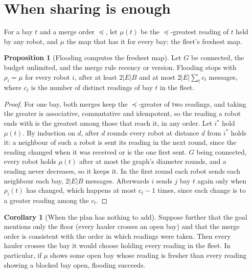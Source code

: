 \documentclass[11pt,a4paper]{article}
\theoremstyle{definition}
\newtheorem{proposition}{Proposition}
\newtheorem{corollary}{Corollary}
\newcommand{\merged}{\mu}
\begin{document}
\section{When sharing is enough}
\label{sec:enough}

For a bay $t$ and a merge order $\preceq$, let $\merged(t)$ be the
$\preceq$-greatest reading of $t$ held by any robot, and $\merged$ the map that has
it for every bay: the fleet's freshest map.

\begin{proposition}[Flooding computes the freshest map]
\label{prop:enough}
Let $G$ be connected, the budget unlimited, and the merge rule recency or version.
Flooding stops with $\rho_i = \merged$ for every robot $i$, after at least
$2|E|B$ and at most $2|E|\sum_t c_t$ messages, where $c_t$ is the number of
distinct readings of bay $t$ in the fleet.
\end{proposition}

\begin{proof}
For one bay, both merges keep the $\preceq$-greater of two readings, and taking the
greater is associative, commutative and idempotent, so the reading a robot ends
with is the greatest among those that reach it, in any order. Let $i^*$ hold
$\merged(t)$. By induction on $d$, after $d$ rounds every robot at distance $d$
from $i^*$ holds it: a neighbour of such a robot is sent its reading in the next
round, since the reading changed when it was received or is the one first sent.
$G$ being connected, every robot holds $\merged(t)$ after at most the graph's
diameter rounds, and a reading never decreases, so it keeps it. In the first round
each robot sends each neighbour each bay, $2|E|B$ messages. Afterwards $i$ sends
$j$ bay $t$ again only when $\rho_i(t)$ has changed, which happens at most
$c_t - 1$ times, since each change is to a greater reading among the $c_t$.
\end{proof}

\begin{corollary}[When the plan has nothing to add]
\label{cor:enough}
Suppose further that the goal mentions only the floor (every hauler crosses an
open bay) and that the merge order is consistent with the order in which readings
were taken. Then every hauler crosses the bay it would choose holding every
reading in the fleet. In particular, if $\merged$ shows some open bay whose
reading is fresher than every reading showing a blocked bay open, flooding
succeeds.
\end{corollary}
\end{document}
